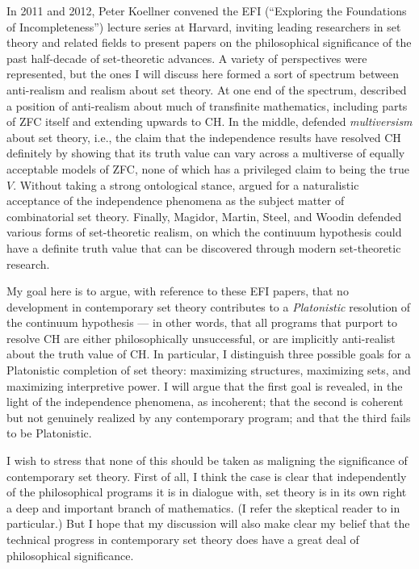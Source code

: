 \documentclass[letterpaper,12pt]{article}
\begin{document}
In 2011 and 2012, Peter Koellner convened the EFI (``Exploring the Foundations of Incompleteness'') lecture series at Harvard, inviting leading researchers in set theory and related fields to present papers on the philosophical significance of the past half-decade of set-theoretic advances. A variety of perspectives were represented, but the ones I will discuss here formed a sort of spectrum between anti-realism and realism about set theory. At one end of the spectrum, \cite{feferman2011ch} described a position of anti-realism about much of transfinite mathematics, including parts of ZFC itself and extending upwards to CH. In the middle, \cite{hamkins2011set} defended \emph{multiversism} about set theory, i.e., the claim that the independence results have resolved CH definitely by showing that its truth value can vary across a multiverse of equally acceptable models of ZFC, none of which has a privileged claim to being the true $V$. Without taking a strong ontological stance, \cite{cummings2012challenges} argued for a naturalistic acceptance of the independence phenomena as the subject matter of combinatorial set theory. Finally, Magidor, Martin, Steel, and Woodin defended various forms of set-theoretic realism, on which the continuum hypothesis could have a definite truth value that can be discovered through modern set-theoretic research.

My goal here is to argue, with reference to these EFI papers, that no development in contemporary set theory contributes to a \emph{Platonistic} resolution of the continuum hypothesis --- in other words, that all programs that purport to resolve CH are either philosophically unsuccessful, or are implicitly anti-realist about the truth value of CH. In particular, I distinguish three possible goals for a Platonistic completion of set theory: maximizing structures, maximizing sets, and maximizing interpretive power. I will argue that the first goal is revealed, in the light of the independence phenomena, as incoherent; that the second is coherent but not genuinely realized by any contemporary program; and that the third fails to be Platonistic.

I wish to stress that none of this should be taken as maligning the significance of contemporary set theory. First of all, I think the case is clear that independently of the philosophical programs it is in dialogue with, set theory is in its own right a deep and important branch of mathematics. (I refer the skeptical reader to \cite{cummings2012challenges} in particular.) But I hope that my discussion will also make clear my belief that the technical progress in contemporary set theory does have a great deal of philosophical significance.
\end{document}
